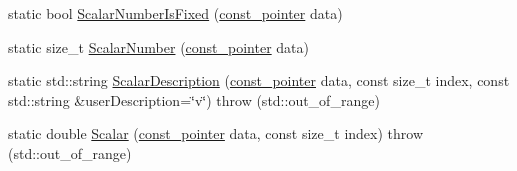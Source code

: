 \begin{DoxyCompactItemize}
\item 
static bool \hyperlink{classcmn_data_3_01__element_type[__size]_4_a35050d0470d40a48d9d6bdef410f803b}{Scalar\-Number\-Is\-Fixed} (\hyperlink{classcmn_data_3_01__element_type[__size]_4_aaf9e2a181a2500f07b6c99b2bf42477f}{const\-\_\-pointer} data)
\item 
static size\-\_\-t \hyperlink{classcmn_data_3_01__element_type[__size]_4_a1e40f88a9327ae4832424c5b807f2fff}{Scalar\-Number} (\hyperlink{classcmn_data_3_01__element_type[__size]_4_aaf9e2a181a2500f07b6c99b2bf42477f}{const\-\_\-pointer} data)
\item 
static std\-::string \hyperlink{classcmn_data_3_01__element_type[__size]_4_a476fe08e0efb517af46ec4e649708903}{Scalar\-Description} (\hyperlink{classcmn_data_3_01__element_type[__size]_4_aaf9e2a181a2500f07b6c99b2bf42477f}{const\-\_\-pointer} data, const size\-\_\-t index, const std\-::string \&user\-Description=\char`\"{}v\char`\"{})  throw (std\-::out\-\_\-of\-\_\-range)
\item 
static double \hyperlink{classcmn_data_3_01__element_type[__size]_4_a9585ed8aab16491a685ad139e7c220c5}{Scalar} (\hyperlink{classcmn_data_3_01__element_type[__size]_4_aaf9e2a181a2500f07b6c99b2bf42477f}{const\-\_\-pointer} data, const size\-\_\-t index)  throw (std\-::out\-\_\-of\-\_\-range)
\end{DoxyCompactItemize}


